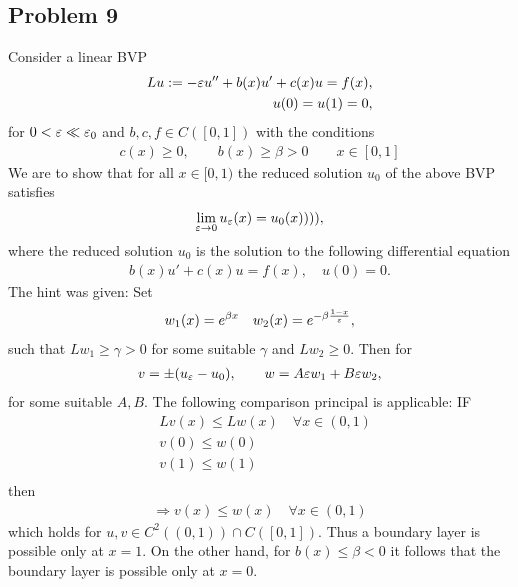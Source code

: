 \subsection{Problem 9}
Consider a linear BVP
\begin{align}
    Lu := -\varepsilon u'' + b(x)u' + c(x)u = f(x),\\
    u(0) = u(1) = 0,
\end{align}
for $0 < \varepsilon \ll \varepsilon_0$ and $b, c, f \in C([0,1])$ with the conditions
\begin{align}
    c(x) \geq 0, \qquad b(x) \geq \beta > 0 \qquad x\in[0, 1]
\end{align}
We are to show that for all $x\in[0, 1)$ the reduced solution $u_0$ of the
above BVP satisfies
\begin{align}
    \lim_{\varepsilon \rightarrow 0} u_\varepsilon(x) = u_0(x)))),
\end{align}
where the reduced solution $u_0$ is the solution to the following
differential equation
\begin{align}
    b(x)u' + c(x)u = f(x), \quad u(0) = 0.
\end{align}
The hint was given: Set
\begin{align}
    w_1(x) = e^{\beta x} \quad w_2(x) = e^{-\beta\frac{1-x}{\varepsilon}},
\end{align}
such that $Lw_1 \geq \gamma > 0$ for some suitable $\gamma$ and $Lw_2 \geq
0$. Then for
\begin{align}
    v = \pm (u_\varepsilon - u_0), \qquad w = A\varepsilon w_1 + B\varepsilon w_2,
\end{align}
for some suitable $A, B$. The following comparison principal is applicable:
IF
\begin{align}
    &Lv(x) \leq Lw(x) \quad \forall x \in (0, 1) \label{eq:cond1}\\
    &v(0) \leq w(0)  \label{eq:cond2}\\
    &v(1) \leq w(1) \label{eq:cond3}\\
\end{align}
then
\begin{align}
    \Longrightarrow v(x) \leq w(x) \quad \forall x\in(0, 1)
\end{align}
which holds for $u, v \in C^2((0, 1)) \cap C([0, 1])$. Thus a boundary layer
is possible only at $x=1$. On the other hand, for $b(x) \leq \beta < 0$ it
follows that the boundary layer is possible only at $x=0$.


